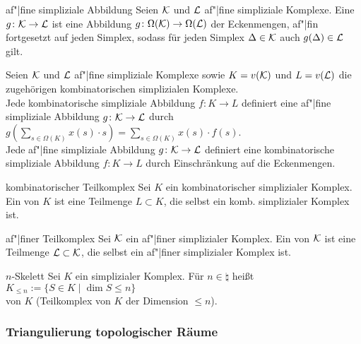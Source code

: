 \begin{Def}{af"|fine simpliziale Abbildung}
    Seien $\mathcal{K}$ und $\mathcal{L}$ af"|fine simpliziale Komplexe.
    Eine 
    $g\colon \mathcal{K} \rightarrow \mathcal{L}$ ist eine Abbildung
    $g\colon \Omega(\mathcal{K}) \rightarrow \Omega(\mathcal{L})$ der Eckenmengen,
    af"|fin fortgesetzt auf jeden Simplex, sodass
    für jeden Simplex $\Delta \in \mathcal{K}$ auch $g(\Delta) \in \mathcal{L}$ gilt.
\end{Def}

\begin{Bem}
    Seien $\mathcal{K}$ und $\mathcal{L}$ af"|fine simpliziale Komplexe sowie
    $K = v(\mathcal{K})$ und $L = v(\mathcal{L})$ die zugehörigen kombinatorischen simplizialen
    Komplexe. \\
    Jede kombinatorische simpliziale Abbildung $f\colon K \rightarrow L$
    definiert eine af"|fine simpliziale Abbildung $g\colon \mathcal{K} \rightarrow \mathcal{L}$
    durch $g(\sum_{s \in \Omega(K)} x(s) \cdot s) =
    \sum_{s \in \Omega(K)} x(s) \cdot f(s)$. \\
    Jede af"|fine simpliziale Abbildung $g\colon \mathcal{K} \rightarrow \mathcal{L}$ definiert
    eine kombinatorische simpliziale Abbildung $f\colon K \rightarrow L$
    durch Einschränkung auf die Eckenmengen.
\end{Bem}

\linie

\begin{Def}{kombinatorischer Teilkomplex}
    Sei $K$ ein kombinatorischer simplizialer Komplex.
    Ein  von $K$ ist eine Teilmenge $L \subset K$,
    die selbst ein komb. simplizialer Komplex ist.
\end{Def}

\begin{Def}{af"|finer Teilkomplex}
    Sei $\mathcal{K}$ ein af"|finer simplizialer Komplex.
    Ein  von $\mathcal{K}$ ist eine Teilmenge $\mathcal{L} \subset \mathcal{K}$,
    die selbst ein af"|finer simplizialer Komplex ist.
\end{Def}

\begin{Def}{$n$-Skelett}
    Sei $K$ ein simplizialer Komplex.
    Für $n \in \natural$ heißt
    $K_{\le n} := \{S \in K \;|\; \dim S \le n\}$ \\
     von $K$
    (Teilkomplex von $K$ der Dimension $\le n$).
\end{Def}

\subsubsection{%
    Triangulierung topologischer Räume%
}

